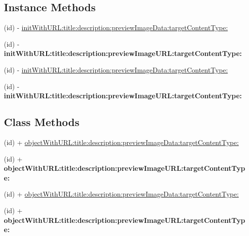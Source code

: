 \subsection*{Instance Methods}
\begin{DoxyCompactItemize}
\item 
(id) -\/ \mbox{\hyperlink{interface_q_q_api_u_r_l_object_ac9b4f31bdacdfbc736c0fa30093de457}{init\+With\+U\+R\+L\+:title\+:description\+:preview\+Image\+Data\+:target\+Content\+Type\+:}}
\item 
\mbox{\label{interface_q_q_api_u_r_l_object_adf82724e3aa7f32f7e3b5c1034c43cb1}} 
(id) -\/ {\bfseries init\+With\+U\+R\+L\+:title\+:description\+:preview\+Image\+U\+R\+L\+:target\+Content\+Type\+:}
\item 
(id) -\/ \mbox{\hyperlink{interface_q_q_api_u_r_l_object_ac9b4f31bdacdfbc736c0fa30093de457}{init\+With\+U\+R\+L\+:title\+:description\+:preview\+Image\+Data\+:target\+Content\+Type\+:}}
\item 
\mbox{\label{interface_q_q_api_u_r_l_object_adf82724e3aa7f32f7e3b5c1034c43cb1}} 
(id) -\/ {\bfseries init\+With\+U\+R\+L\+:title\+:description\+:preview\+Image\+U\+R\+L\+:target\+Content\+Type\+:}
\end{DoxyCompactItemize}
\subsection*{Class Methods}
\begin{DoxyCompactItemize}
\item 
(id) + \mbox{\hyperlink{interface_q_q_api_u_r_l_object_a6281eb225def4745ab64e6f92364ffd2}{object\+With\+U\+R\+L\+:title\+:description\+:preview\+Image\+Data\+:target\+Content\+Type\+:}}
\item 
\mbox{\label{interface_q_q_api_u_r_l_object_aa4ae8346770ecd34a9d660c305aa515a}} 
(id) + {\bfseries object\+With\+U\+R\+L\+:title\+:description\+:preview\+Image\+U\+R\+L\+:target\+Content\+Type\+:}
\item 
(id) + \mbox{\hyperlink{interface_q_q_api_u_r_l_object_a6281eb225def4745ab64e6f92364ffd2}{object\+With\+U\+R\+L\+:title\+:description\+:preview\+Image\+Data\+:target\+Content\+Type\+:}}
\item 
\mbox{\label{interface_q_q_api_u_r_l_object_aa4ae8346770ecd34a9d660c305aa515a}} 
(id) + {\bfseries object\+With\+U\+R\+L\+:title\+:description\+:preview\+Image\+U\+R\+L\+:target\+Content\+Type\+:}
\end{DoxyCompactItemize}
